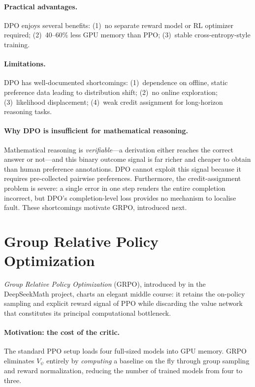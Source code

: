 \documentclass[12pt,a4paper]{report}
\begin{document}
\paragraph{Practical advantages.}
DPO enjoys several benefits: (1)~no separate reward model or RL optimizer required; (2)~40--60\% less GPU memory than PPO; (3)~stable cross-entropy-style training.

\paragraph{Limitations.}
DPO has well-documented shortcomings: (1)~dependence on offline, static preference data leading to distribution shift; (2)~no online exploration; (3)~likelihood displacement; (4)~weak credit assignment for long-horizon reasoning tasks.

\paragraph{Why DPO is insufficient for mathematical reasoning.}
Mathematical reasoning is \emph{verifiable}---a derivation either reaches the correct answer or not---and this binary outcome signal is far richer and cheaper to obtain than human preference annotations. DPO cannot exploit this signal because it requires pre-collected pairwise preferences. Furthermore, the credit-assignment problem is severe: a single error in one step renders the entire completion incorrect, but DPO's completion-level loss provides no mechanism to localise fault. These shortcomings motivate GRPO, introduced next.


\section{Group Relative Policy Optimization}
\label{sec:grpo}

\emph{Group Relative Policy Optimization} (GRPO), introduced by \cite{shao2024deepseekmath} in the DeepSeekMath project, charts an elegant middle course: it retains the on-policy sampling and explicit reward signal of PPO while discarding the value network that constitutes its principal computational bottleneck.

\paragraph{Motivation: the cost of the critic.}
The standard PPO setup loads four full-sized models into GPU memory. GRPO eliminates $V_\psi$ entirely by \emph{computing} a baseline on the fly through group sampling and reward normalization, reducing the number of trained models from four to three.
\end{document}
